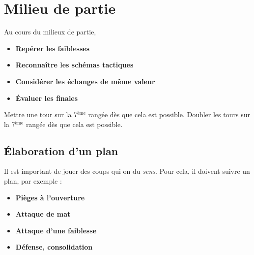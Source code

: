 

%

\section{Milieu de partie}
%
%
Au cours du milieux de partie,

\begin{itemize}[leftmargin=2.7cm, label=, itemsep=0pt]%
\item  {\bf Repérer les faiblesses}
\item  {\bf Reconnaître les schémas tactiques}
\item  {\bf Considérer les échanges de même valeur}
\item  {\bf Évaluer les finales}
\end{itemize}

Mettre une tour sur la 7$^\text{ème}$ rangée dès que cela est possible.
Doubler les tours sur la 7$^\text{ème}$ rangée dès que cela est possible.

\subsection{Élaboration d'un plan}

Il est important de jouer des coups qui on du {\it sens}. Pour cela, il doivent suivre un plan, par exemple : 

\begin{itemize}[leftmargin=2.7cm, label=, itemsep=0pt]%
\item  {\bf Pièges à l'ouverture}
\item  {\bf Attaque de mat}
\item  {\bf Attaque d'une faiblesse}
\item  {\bf Défense, consolidation}
\end{itemize}

%
%
%



